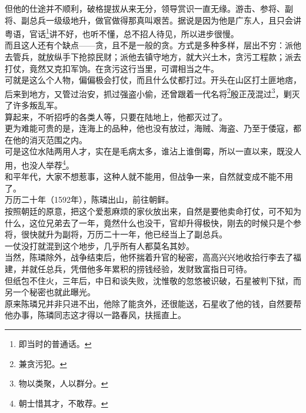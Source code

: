 \begin{multicols}{\theparacolNo}
但他的仕途并不顺利，破格提拔从来无分，领导赏识一直无缘。游击、参将、副将、副总兵一级级地升，做官做得那真叫艰苦。据说是因为他是广东人，且只会讲粤语，官话\footnote{即当时的普通话。}讲不好，也听不懂，总不招人待见，所以进步很慢。\\

而且这人还有个缺点——贪，且不是一般的贪。方式是多种多样，层出不穷：派他去管兵，就放纵手下抢掠民财；派他去镇守地方，就大兴土木，贪污工程款；派去打仗，竟然又克扣军饷。在贪污这行当里，可谓相当之牛。\\

可就是这么个人物，偏偏极会打仗，而且什么仗都打过。开头在山区打土匪地痞，后来到地方，又管过治安，抓过强盗小偷，还曾跟着一代名将\footnote{兼贪污犯。}殷正茂混过\footnote{物以类聚，人以群分。}，剿灭了许多叛乱军。\\

算起来，不听招呼的各类人等，只要在陆地上，他都灭过了。\\

更为难能可贵的是，连海上的品种，他也没有放过，海贼、海盗、乃至于倭寇，都在他的消灭范围之内。\\

可是这位水陆两用人才，实在是毛病太多，谁沾上谁倒霉，所以一直以来，既没人用，也没人举荐\footnote{朝士惜其才，不敢荐。}。\\

和平年代，大家不想惹事，这种人就不能用，但战争一来，自然就变成不能不用了。\\

万历二十年（1592年），陈璘出山，前往朝鲜。\\

按照朝廷的原意，把这个爱惹麻烦的家伙放出来，自然是要他卖命打仗，可不知为什么，这位兄弟去了一年，竟然什么也没干，官却升得极快，刚去的时候只是个参将，很快就升为副将，万历二十一年，他已经当上了副总兵。\\

一仗没打就混到这个地步，几乎所有人都莫名其妙。\\

当然，陈璘除外，战争结束后，他怀揣着升官的秘密，高高兴兴地收拾行李去了福建，并就任总兵，凭借他多年累积的捞钱经验，发财致富指日可待。\\

但纸包不住火，三年后，中日和谈失败，沈惟敬的忽悠被识破，石星被判下狱，而另一个秘密也就此曝光。\\

原来陈璘兄并非只进不出，他除了能贪外，还很能送，石星收了他的钱，自然要帮他办事，陈璘同志这才得以一路春风，扶摇直上。\\


\end{multicols}
